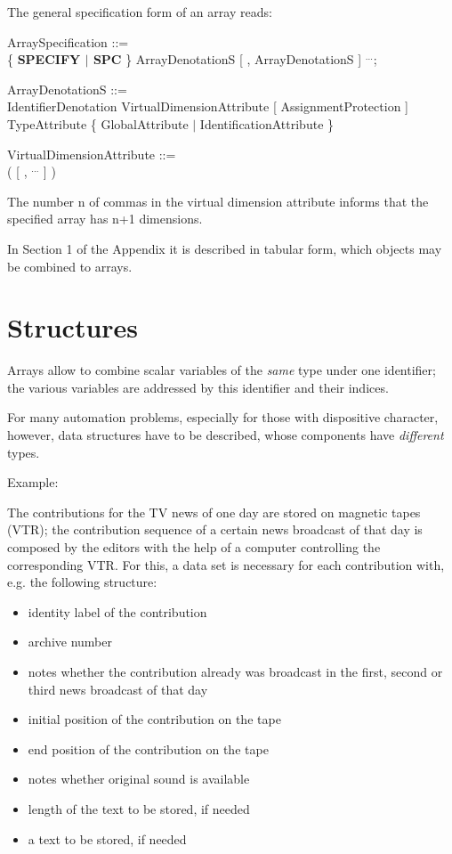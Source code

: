 The general specification form of an array reads:

ArraySpecification ::=\\
\x \{ {\bf SPECIFY $\mid$ SPC} \} ArrayDenotationS [ , ArrayDenotationS ] $^{...}$;

ArrayDenotationS ::=\\
\x IdentifierDenotation VirtualDimensionAttribute [ AssignmentProtection ] \\
\x TypeAttribute \{ GlobalAttribute $\mid$ IdentificationAttribute \}

VirtualDimensionAttribute ::=\\
\x ( [ , $^{...}$ ] )

The number n of commas in the virtual dimension attribute informs that
the specified array has n+1 dimensions.

In Section 1 of the Appendix it is described in tabular form, which
objects may be combined to arrays.


\section{Structures}   %

Arrays allow to combine scalar variables of the {\it same} type under
one identifier; the various variables are addressed by this identifier
and their indices.

For many automation problems, especially for those with dispositive
character, however, data structures have to be described, whose
components have {\it different} types.

Example:

The contributions for the TV news of one day are stored on magnetic
tapes (VTR); the contribution sequence of a certain news broadcast of
that day is composed by the editors with the help of a computer
controlling the corresponding VTR. For this, a data set is necessary for
each contribution with, e.g. the following structure:

\begin{itemize}
\item identity label of the contribution
\item archive number
\item notes whether the contribution already was broadcast in the first,
second or third news broadcast of that day
\item initial position of the contribution on the tape
\item end position of the contribution on the tape
\item notes whether original sound is available
\item length of the text to be stored, if needed
\item a text to be stored, if needed
\end{itemize}

